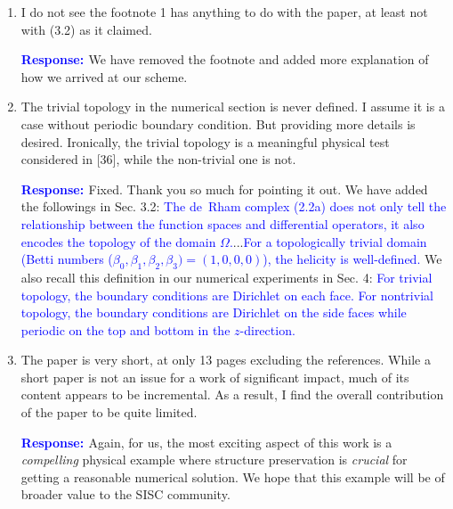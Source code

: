 \documentclass{article}
\theoremstyle{definition}
\newcommand{\rv}[1]{%
  \colorbox{gray!20}{%
    \parbox{0.96\linewidth}{%
      \small #1
    }%
  }%
}
\newcommand{\rp}{\textbf{\textcolor{blue}{Response: }}}
\newcommand{\blue}[1]{\textcolor{blue}{#1}}
\begin{document}
\begin{enumerate}
\item \rv{I do not see the footnote 1 has anything to do with the paper, at least not with (3.2) as it claimed.}

\rp We have removed the footnote and added more explanation of how we arrived at our scheme. 

\item \rv{The trivial topology in the numerical section is never defined. I assume it is a case without periodic boundary condition. But providing more details is desired. Ironically, the trivial topology is a meaningful physical test considered in [36], while the non-trivial one is not.}

\rp Fixed. Thank you so much for pointing it out. We have added the followings in Sec. 3.2: \blue{The de~Rham complex (2.2a) does not only tell the relationship between the function spaces and differential operators, it also encodes the topology of the domain $\Omega$.}...\blue{For a topologically trivial domain (Betti numbers ($\beta_0, \beta_1, \beta_2, \beta_3) = (1, 0, 0, 0)$), the helicity is well-defined.} We also recall this definition in our numerical experiments in Sec. 4: \blue{For trivial topology, the boundary conditions are Dirichlet on each face. For nontrivial topology, the boundary conditions are Dirichlet on the side faces while periodic on the top and bottom in the $z$-direction.}

\item \rv{The paper is very short, at only 13 pages excluding the references. While a short paper is not an issue for a work of significant impact, much of its content appears to be incremental. As a result, I find the overall contribution of the paper to be quite limited.
}

\rp Again, for us, the most exciting aspect of this work is a \emph{compelling} physical example where structure preservation is \emph{crucial} for getting a reasonable numerical solution. We hope that this example will be of broader value to the SISC community.
\end{enumerate}

\clearpage


\end{document}
